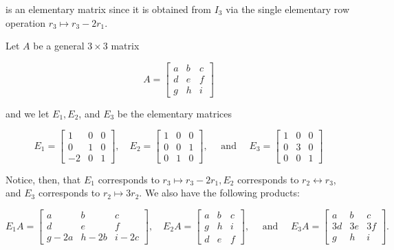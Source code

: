 is an elementary matrix since it is obtained from $I_3$ via the single elementary row operation $r_3 \mapsto r_3-2 r_1$.

\begin{example}

Let $A$ be a general $3 \times 3$ matrix

\[
A=\left[\begin{array}{lll}
a & b & c \\
d & e & f \\
g & h & i
\end{array}\right]
\]

and we let $E_1, E_2$, and $E_3$ be the elementary matrices

\[
E_1=\left[\begin{array}{ccc}
1 & 0 & 0 \\
0 & 1 & 0 \\
-2 & 0 & 1
\end{array}\right], \quad E_2=\left[\begin{array}{lll}
1 & 0 & 0 \\
0 & 0 & 1 \\
0 & 1 & 0
\end{array}\right], \quad \text { and } \quad E_3=\left[\begin{array}{lll}
1 & 0 & 0 \\
0 & 3 & 0 \\
0 & 0 & 1
\end{array}\right]
\]
\end{example}

Notice, then, that $E_1$ corresponds to $r_3 \mapsto r_3-2 r_1, E_2$ corresponds to $r_2 \longleftrightarrow r_3$, and $E_3$ corresponds to $r_2 \mapsto 3 r_2$. We also have the following products:

\[
E_1 A=\left[\begin{array}{ccc}
a & b & c \\
d & e & f \\
g-2 a & h-2 b & i-2 c
\end{array}\right], \quad E_2 A=\left[\begin{array}{ccc}
a & b & c \\
g & h & i \\
d & e & f
\end{array}\right], \quad \text { and } \quad E_3 A=\left[\begin{array}{ccc}
a & b & c \\
3 d & 3 e & 3 f \\
g & h & i
\end{array}\right] .
\]



